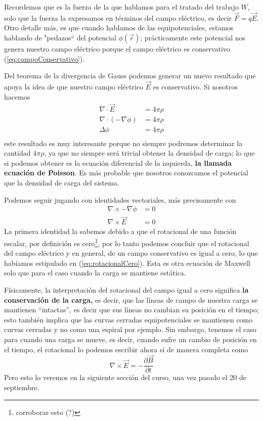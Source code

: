 \documentclass[11pt,a4paper]{article}
\begin{document}
Recordemos que es la fuerza de la que hablamos para el tratado del trabajo $W$, solo que la fuerza la expresamos en términos del campo eléctrico, es decir $\vec{F}=q\vec{E}$. Otro detalle más, es que cuando hablamos de las equipotenciales, estamos hablando de "pedazos“ del potencial $\phi(\vec{r})$; prácticamente este potencial nos genera nuestro campo eléctrico porque el campo eléctrico es conservativo (\ref{eq:campoConservativo}).

Del teorema de la divergencia de Gauss podemos generar un nuevo resultado que apoya la idea de que nuestro campo eléctrico $\vec{E}$ es conservativo. Si nosotros hacemos 
\begin{align*}
\nabla\cdot\vec{E}&=4\pi\rho\\
\nabla\cdot(-\nabla\phi)&=4\pi\rho\\
\Delta\phi&=4\pi\rho\\
\end{align*}
este resultado es muy interesante porque no siempre podremos determinar la cantidad $4\pi\rho$, ya que no siempre será trivial obtener la densidad de carga; lo que si podemos obtener es la ecuación diferencial de la izquierda, \textbf{la llamada ecuación de Poisson}. Es más probable que nosotros conozcamos el potencial que la densidad de carga del sistema.

Podemos seguir jugando con identidades vectoriales, más precisamente con
\begin{align*}
\nabla\times-\nabla\phi&=0\\
\nabla\times \vec{E}&=0
\end{align*}
La primera identidad la sabemos debido a que el rotacional de una función escalar, por definición es cero\footnote{corroborar esto (?)}, por lo tanto podemos concluir que el rotacional del campo eléctrico y en general, de un campo conservativo es igual a cero, lo que habíamos estipulado en (\ref{eq:rotacionalCero}). Esta es otra ecuación de Maxwell solo que para el caso cuando la carga se mantiene estática.

Físicamente, la interpretación del rotacional del campo igual a cero significa \textbf{la conservación de la carga,} es decir, que las líneas de campo de nuestra carga se mantienen “intactas'', es decir que sus líneas no cambian su posición en el tiempo; esto también implica que las curvas cerradas equipotenciales se mantienen como curvas cerradas y no como una espiral por ejemplo. Sin embargo, tenemos el caso para cuando una carga se mueve, es decir, cuando sufre un cambio de posición en el tiempo, el rotacional lo podemos escribir ahora sí de manera completa como 
\begin{equation}\label{eq:rotacionalChido}
\nabla\times\vec{E}=-\frac{\partial\vec{B}}{\partial t}
\end{equation}
Pero esto lo veremos en la siguiente sección del curso, una vez pasado el 20 de septiembre.
\end{document}

